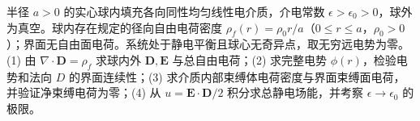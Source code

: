 半径 \(a>0\) 的实心球内填充各向同性均匀线性电介质，介电常数 \(\epsilon>\epsilon_0>0\)，球外为真空。球内存在规定的径向自由电荷密度 \(\rho_f(r)=\rho_0r/a\)（\(0\le r\le a\)，\(\rho_0>0\)）；界面无自由面电荷。系统处于静电平衡且球心无奇异点，取无穷远电势为零。
(1) 由 \(\nabla\cdot\boldsymbol D=\rho_f\) 求球内外 \(\boldsymbol D,\boldsymbol E\) 与总自由电荷；(2) 求完整电势 \(\phi(r)\)，检验电势和法向 \(D\) 的界面连续性；(3) 求介质内部束缚体电荷密度与界面束缚面电荷，并验证净束缚电荷为零；(4) 从 \(u=\boldsymbol E\cdot\boldsymbol D/2\) 积分求总静电场能，并考察 \(\epsilon\to\epsilon_0\) 的极限。
